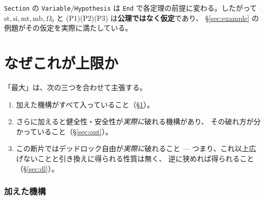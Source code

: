 \documentclass[11pt,a4paper]{ltjsarticle}
\theoremstyle{definition}
\theoremstyle{remark}
\newcommand{\Om}{\Omega}
\newcommand{\styp}{\mathrm{st}}
\newcommand{\mtab}{\mathrm{mt}}
\newcommand{\mbody}{\mathrm{mb}}
\newcommand{\sinit}{\mathrm{si}}
\begin{document}
\texttt{Section} の \texttt{Variable}/\texttt{Hypothesis} は
\texttt{End} で各定理の前提に変わる。したがって
$\styp,\sinit,\mtab,\mbody,\Om_0$ と (P1)(P2)(P3) は\textbf{公理ではなく仮定}であり、
\S\ref{sec:example} の例題がその仮定を実際に満たしている。

\part{なぜこれが上限か}

「最大」は、次の三つを合わせて主張する。
\begin{enumerate}
\item 加えた機構がすべて入っていること（\S\ref{sec:in}）。
\item さらに加えると健全性・安全性が\emph{実際に}破れる機構があり、
      その破れ方が分かっていること（\S\ref{sec:out}）。
\item この断片ではデッドロック自由が\emph{実際に}破れること
      --- つまり、これ以上広げないことと引き換えに得られる性質は無く、
      逆に狭めれば得られること（\S\ref{sec:dl}）。
\end{enumerate}

\section{加えた機構}\label{sec:in}
\end{document}
